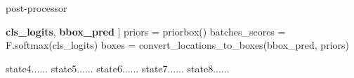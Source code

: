 


\begin{algorithm}[h]  
      \caption{post-processor}  
      \label{your label}  
      \begin{algorithmic}[1]  
        \Require  
          \textbf{cls\_logits}, \textbf{bbox\_pred}
        \Ensure  
          [[processed_boxes, processed_labels, processed_scores]]
        \State priors = priorbox()
        \State batches\_scores = F.softmax(cls\_logits)
        \State boxes = convert\_locations\_to\_boxes(bbox\_pred, priors)
      
            \State  state4......  
                \State state5......  
            \Else  
                \State state6......  
            \EndIf  
            \State state7......  
        \EndWhile  
            \State state8......  
        \EndFor  
      \end{algorithmic}  
    \end{algorithm}
